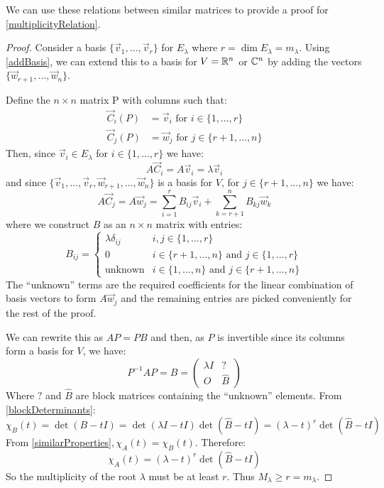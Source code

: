 \documentclass[../main.tex]{subfiles}
\begin{document}
We can use these relations between similar matrices to provide a proof for \cref{multiplicityRelation}.
\begin{proof}
  \nonexaminable
  \label{multiplicityProof}
  Consider a basis $\{\vec{v}_1, \ldots, \vec{v}_r\}$ for $E_\lambda$ where $r = \dim E_\lambda = m_\lambda$.
  Using \cref{addBasis}, we can extend this to a basis for $V = \mathbb{R}^{n}$ or $\mathbb{C}^{n}$ by adding the vectors $\{\vec{w}_{r + 1}, \ldots, \vec{w}_n\}$.

  Define the $n \times n$ matrix P with columns such that:
  \begin{align*}
    \vec{C}_i(P) &= \vec{v}_i \text{ for } i \in \{1, \ldots, r\} \\
    \vec{C}_j(P) &= \vec{w}_j \text{ for } j \in \{r + 1, \ldots, n\}
  \end{align*}
  Then, since $\vec{v}_i \in E_\lambda$ for $i \in \{1, \ldots, r\}$ we have:
  \[
    A \vec{C}_i = A \vec{v}_i = \lambda \vec{v}_i
  \]
  and since $\{\vec{v}_1, \ldots, \vec{v}_r, \vec{w}_{r + 1}, \ldots, \vec{w}_n\}$ is a basis for $V$, for $j \in \{r + 1, \ldots, n\}$ we have:
  \[
    A \vec{C}_j = A \vec{w}_j = \sum_{i = 1}^{r} B_{i j}\vec{v}_i + \sum_{k = r + 1}^{n} B_{k j}\vec{w}_k
  \]
  where we construct $B$ as an $n \times n$ matrix with entries:
  \[
    B_{i j} = \begin{cases}
    \lambda \delta_{i j} & i, j \in \{1, \ldots, r\} \\
    0 & i \in \{r + 1, \ldots, n\} \text{ and } j \in \{1, \ldots, r\}  \\
    \text{unknown} & i \in \{1, \ldots, n\} \text{ and } j \in \{r + 1, \ldots, n\}
    \end{cases}
  \]
  The ``unknown'' terms are the required coefficients for the linear combination of basis vectors to form $A \vec{w}_j$ and the remaining entries are picked conveniently for the rest of the proof.

  We can rewrite this as $AP = PB$ and then, as $P$ is invertible since its columns form a basis for $V$, we have:
  \[
    P^{-1}AP = B =
      \left(\begin{array}{c|c}
      \lambda I & ? \\ \hline
      O & \hat{B}
      \end{array}\right)
  \]
  Where $?$ and $\hat{B}$ are block matrices containing the ``unknown'' elements.
  From \cref{blockDeterminants}:
  \[
    \chi_B(t) = \det(B - tI) = \det(\lambda I - tI)\det(\hat{B} - tI) = (\lambda - t)^{r}\det(\hat{B} - tI)
  \]
  From \cref{similarProperties}$, \chi_A(t) = \chi_B(t)$.
  Therefore:
  \[
    \chi_A(t)= (\lambda - t)^{r}\det(\hat{B} - tI)
  \]
  So the multiplicity of the root $\lambda$ must be at least $r$.
  Thus $M_\lambda \geq r = m_\lambda$.
\end{proof}
\end{document}
